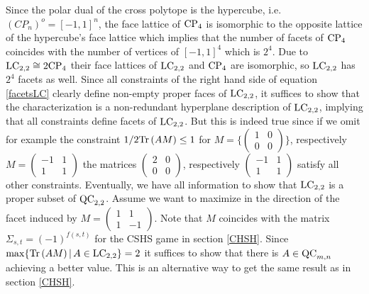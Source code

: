 Since the polar dual of the cross polytope is the hypercube, i.e. $ (CP_n)^o = [-1,1]^n $,  the face lattice of $ \textup{CP}_4 $ is isomorphic to the opposite lattice of the hypercube's face lattice which implies that the number of facets of $ \textup{CP}_4 $ coincides with the number of vertices of $ [-1,1]^4 $ which is $ 2^4 $. Due to $  \textup{LC}_{2,2} \cong 2\textup{CP}_4$ their face lattices of $ \textup{LC}_{2,2} $ and $ \textup{CP}_4 $ are isomorphic, so $ \textup{LC}_{2,2} $ has $ 2^4 $ facets as well. 
Since all constraints of the right hand side of equation \ref{facetsLC} clearly define non-empty proper faces of $ \textup{LC}_{2,2} $, it suffices to show that the characterization is a non-redundant hyperplane description of $ \textup{LC}_{2,2} $, implying that all constraints define facets of $ \textup{LC}_{2,2} $. But this is indeed true since if we omit for example the constraint 
$ 1/2 \textup{Tr} \, {(AM)}  \le 1 $ for $ M = \{ \begin{pmatrix}
1 & 0 \\ 0 & 0
\end{pmatrix} \} $, respectively $ M = \begin{pmatrix}
-1 & 1 \\ 1 & 1 
\end{pmatrix} $
the matrices $ \begin{pmatrix}
2 & 0 \\ 0 & 0 
\end{pmatrix} $, respectively $ \begin{pmatrix}
-1 & 1 \\ 1 & 1
\end{pmatrix} $ 
satisfy all other constraints. 
Eventually, we have all information to show that $ \textup{LC}_{2,2} $ is a proper subset of $ \textup{QC}_{2,2} $. 
Assume we want to maximize in the direction of the facet induced by $M = \begin{pmatrix}
1 & 1 \\ 1 & -1 
\end{pmatrix} $. Note that $ M $ coincides with the matrix $ \Sigma_{s,t} = (-1)^{f(s,t)} $ for the CSHS game in section \ref{CHSH}. Since $ \max \{  \textup{Tr} \, {(AM)} \, | \, A \in \textup{LC}_{2,2} \} = 2 $ it suffices to show that there is $ A \in \textup{QC}_{m,n} $ achieving a better value. 
This is an alternative way to get the same result as in section \ref{CHSH}.

